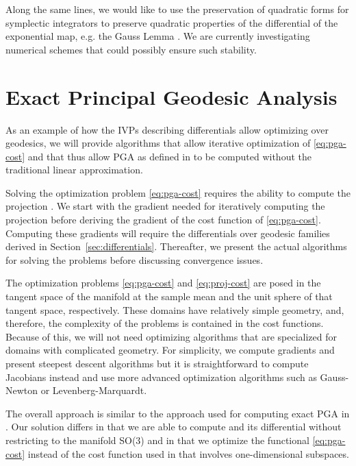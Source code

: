 \documentclass[final]{svjour3}
\begin{document}
Along the same lines, we would like to use the preservation of quadratic
forms for symplectic integrators \cite{hairer_geometric_2002} to preserve
quadratic properties of the differential of the exponential map, e.g. the Gauss
Lemma \cite{do_carmo_riemannian_1992}. We are currently
investigating numerical schemes that could possibly ensure such stability.

\section{Exact Principal Geodesic Analysis}
\label{sec:pga}
As an example of how the IVPs describing differentials allow
optimizing over geodesics, we will provide algorithms that allow iterative
optimization of \eqref{eq:pga-cost} and that thus allow PGA as defined in
\cite{fletcher_principal_2004-1} to be computed without the traditional linear 
approximation.

Solving the optimization problem \eqref{eq:pga-cost} 
requires the ability to compute the projection .
We start with the gradient needed for iteratively computing the projection before deriving
the gradient of the cost function of 
\eqref{eq:pga-cost}. Computing these gradients will
require the differentials over geodesic families
derived in Section~\ref{sec:differentials}.
Thereafter, we present the actual algorithms for solving the problems before
discussing convergence issues.

The optimization problems \eqref{eq:pga-cost} and \eqref{eq:proj-cost} are posed
in the tangent space of the manifold at the sample mean and the unit sphere
of that tangent space, respectively. These domains have relatively simple
geometry, and, therefore, the complexity of the problems is contained in the
cost functions. Because of this, we will not need optimizing
algorithms that are specialized for domains with complicated geometry.
For simplicity, we compute
gradients and present steepest descent algorithms but it is straightforward to
compute Jacobians instead and use more advanced optimization algorithms such as
Gauss-Newton or Levenberg-Marquardt.

The overall approach is similar 
to the approach used for computing exact PGA in \cite{said_exact_2007}. Our solution differs in that we are
able to compute  and its differential without restricting to
the manifold SO(3) and in that we optimize the functional \eqref{eq:pga-cost} instead of
the cost function used in \cite{fletcher_statistics_2003} that involves one-dimensional 
subspaces.
\end{document}
